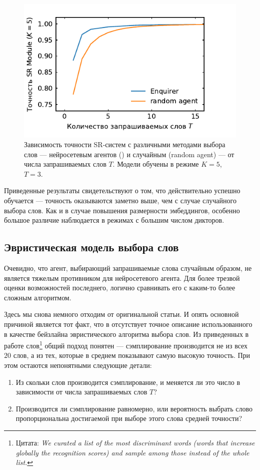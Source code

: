 \begin{figure}[!h]
    \centering
    \includegraphics[scale=1.0]{../plots/word_sweep_enq.pdf}
    \caption{Зависимость точности SR-систем с различными методами выбора слов
    --- нейросетевым агентов (\enquirer{}) и случайным (random agent) --- от
    числа запрашиваемых слов $T$. Модели обучены в режиме $K = 5$, $T = 3$.}
\end{figure}

Приведенные результаты свидетельствуют о том, что \enquirer{} действительно
успешно обучается --- точность оказываются заметно выше, чем с случае
случайного выбора слов. Как и в случае повышения размерности эмбеддингов,
особенно большое различие наблюдается в режимах с большим числом дикторов.

\subsection{Эвристическая модель выбора слов}

Очевидно, что агент, выбирающий запрашиваемые слова случайным образом, не
является тяжелым противником для нейросетевого агента. Для более трезвой
оценки возможностей последнего, логично сравнивать его с каким-то более сложным
алгоритмом.

Здесь мы снова немного отходим от оригинальной статьи. И опять основной
причиной является тот факт, что в \citeisr{} отсутствует точное описание
использованного в качестве бейзлайна эвристического алгоритма выбора слов.
Из приведенных в работе слов\footnote{
    Цитата: \textit{We curated a list of the most discriminant
    words (words that increase globally the recognition scores)
    and sample among those instead of the whole list.}
}
общий подход понятен --- сэмплирование производится не из всех $20$ слов, а
из тех, которые в среднем показывают самую высокую точность. При этом остаются
непонятными следующие детали:
\begin{enumerate}
    \item Из скольки слов производится сэмплирование, и меняется ли это число
    в зависимости от числа запрашиваемых слов $T$?
    \item Производится ли сэмплирование равномерно, или вероятность выбрать
    слово пропорциональна достигаемой при выборе этого слова средней точности?
\end{enumerate}

